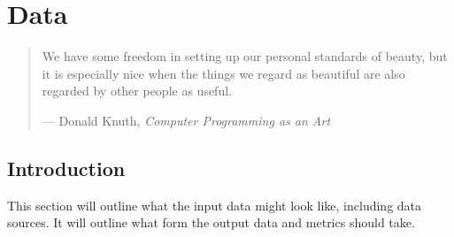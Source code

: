 %
%
%
%

\chapter{Data}\label{C.data}

\begin{quote}
We have some freedom in setting up our personal standards of beauty, but it is
especially nice when the things we regard as beautiful are also regarded by
other people as useful.

\hspace{2cm}--- Donald Knuth, \emph{Computer Programming as an Art}
\end{quote}

\section{Introduction}\label{S.intro3}

This section will outline what the input data might look like, including data
sources.  It will outline what form the output data and metrics should take.

